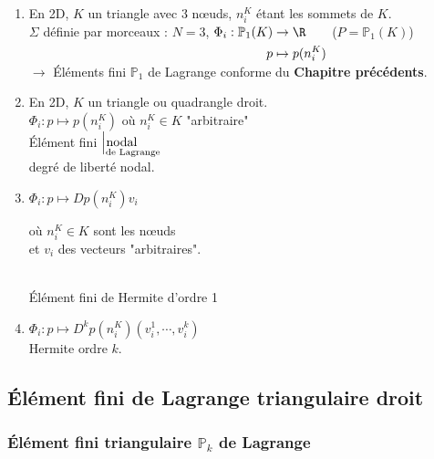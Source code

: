 \documentclass[12pt,a4paper]{article}
\begin{document}
		\begin{ex}$ $
				
			\begin{enumerate}
				\item \begin{minipage}[t]{18.5cm}
					En 2D, $K$ un triangle avec 3 nœuds, $n_i^K$ étant les sommets de $K$.\\
				$\Sigma$ définie par morceaux : $N = 3$, $\Phi_i : \begin{aligned}[t]
					\mathbb{P}_1(K) & \to \R \\
					p & \mapsto p(n_i^K)
				\end{aligned}$ ($P = \mathbb P_1(K)$)\\
				$\to$ Éléments fini $\mathbb P_1$ de Lagrange conforme du \textbf{Chapitre précédents}.
				\end{minipage}
				\item  \begin{minipage}[t]{18.5cm}
					En 2D, $K$ un triangle ou quadrangle droit.\\
					$\Phi_i : p \mapsto p(n_i^K)$ où $n_i^K \in K$ "arbitraire"\\
					Élément fini $\Big|_\text{de Lagrange}\hspace{-1.5cm}\text{nodal}$\\
					degré de liberté nodal.
				\end{minipage}
				
				\item \begin{minipage}[t]{18.5cm}
					$\Phi_i : p \mapsto Dp(n_i^K)v_i$ \begin{minipage}[t]{15cm}
						où $n_i^K \in K$ sont les nœuds \\
						et $v_i$ des vecteurs "arbitraires".
					\end{minipage}\\
					Élément fini de Hermite d'ordre 1
				\end{minipage}
				\item $\Phi_i : p \mapsto D^kp(n_i^K)(v_i^1,\cdots,v_i^k)$\\
				Hermite ordre $k$.
			\end{enumerate}
		\end{ex}
		
	\subsection{Élément fini de Lagrange triangulaire droit}
	\subsubsection{Élément fini triangulaire $\mathbb P_k$ de Lagrange}
	
\end{document}

